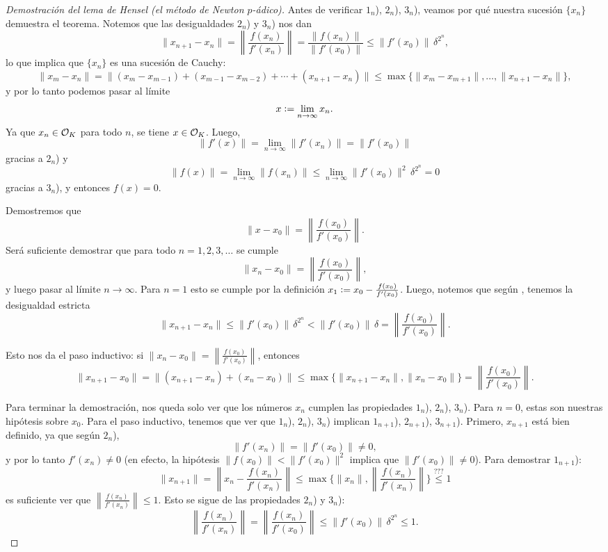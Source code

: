 \documentclass{article}
\numberwithin{equation}{section}
\theoremstyle{definition}
\begin{document}
\begin{proof}[Demostración del lema de Hensel (el método de Newton $p$-ádico)]
  Antes de verificar $1_n$), $2_n$), $3_n$), veamos por qué nuestra sucesión
  $\{ x_n \}$ demuestra el teorema. Notemos que las desigualdades $2_n$) y
  $3_n$) nos dan
  \begin{equation}
    \label{eqn:Hensel-proof-Cauchy-bound}
     \|x_{n+1} - x_n\| =
     \left\|\frac{f (x_n)}{f' (x_n)}\right\| =
     \frac{\|f (x_n)\|}{\|f' (x_0)\|} \le \|f' (x_0)\| \, \delta^{2^n},
  \end{equation}
  lo que implica que $\{ x_n \}$ es una sucesión de Cauchy:
  \[ \|x_m - x_n\| =
     \|(x_m - x_{m-1}) + (x_{m-1} - x_{m-2}) + \cdots + (x_{n+1} - x_n) \| \le
     \max \{ \|x_m - x_{m+1}\|, \ldots, \|x_{n+1} - x_n\| \}, \]
  y por lo tanto podemos pasar al límite
  $$x \mathrel{\mathop:}= \lim_{n\to \infty} x_n.$$
  Ya que $x_n \in \mathcal{O}_K$ para todo $n$, se tiene $x \in \mathcal{O}_K$. Luego,
  $$\|f' (x)\| = \lim_{n\to \infty} \|f' (x_n)\| = \|f' (x_0)\|$$
  gracias a $2_n$) y
  \[ \|f (x)\| = \lim_{n\to \infty} \|f (x_n)\| \le
     \lim_{n\to \infty} \|f' (x_0)\|^2\,\delta^{2^n} = 0 \]
  gracias a $3_n$), y entonces $f (x) = 0$.

  \vspace{1em}

  Demostremos que
  $$\|x - x_0\| = \left\|\frac{f (x_0)}{f' (x_0)}\right\|.$$
  Será suficiente demostrar que para todo $n = 1,2,3,\ldots$ se cumple
  $$\|x_n - x_0\| = \left\|\frac{f (x_0)}{f' (x_0)}\right\|,$$
  y luego pasar al límite $n \to \infty$. Para $n = 1$ esto se cumple por
  la definición $x_1 \mathrel{\mathop:}= x_0 - \frac{f (x_0)}{f' (x_0)}$. Luego, notemos que
  según , tenemos la desigualdad estricta
  \[ \|x_{n+1} - x_n\| \le \|f' (x_0)\| \, \delta^{2^n} <
     \|f' (x_0)\| \, \delta =
     \left\|\frac{f (x_0)}{f' (x_0)}\right\|. \]

  Esto nos da el paso inductivo: si
  $\|x_n - x_0\| = \left\|\frac{f (x_0)}{f' (x_0)}\right\|$, entonces
  \[ \|x_{n+1} - x_0\| =
     \|(x_{n+1} - x_n) + (x_n - x_0)\| \le
     \max \{ \|x_{n+1} - x_n\|, \|x_n - x_0\| \} =
     \left\|\frac{f (x_0)}{f' (x_0)}\right\|. \]

  \vspace{1em}

  Para terminar la demostración, nos queda solo ver que los números $x_n$
  cumplen las propiedades $1_n$), $2_n$), $3_n$). Para $n = 0$, estas son
  nuestras hipótesis sobre $x_0$. Para el paso inductivo, tenemos que ver que
  $1_n$), $2_n$), $3_n$) implican $1_{n+1}$), $2_{n+1}$), $3_{n+1}$). Primero,
  $x_{n+1}$ está bien definido, ya que según $2_n$),
  $$\|f' (x_n)\| = \|f' (x_0)\| \ne 0,$$
  y por lo tanto $f' (x_n) \ne 0$ (en efecto, la hipótesis
  $\|f (x_0)\| < \|f' (x_0)\|^2$ implica que $\|f' (x_0)\| \ne 0$). Para
  demostrar $1_{n+1}$):
  \[ \|x_{n+1}\| = \left\|x_n - \frac{f (x_n)}{f' (x_n)}\right\| \le
     \max \{\|x_n\|, \left\|\frac{f (x_n)}{f' (x_n)}\right\| \} \stackrel{???}{\le} 1 \]
  es suficiente ver que $\left\|\frac{f (x_n)}{f' (x_n)}\right\| \le 1$. Esto
  se sigue de las propiedades $2_n$) y $3_n$):
  \[ \left\|\frac{f (x_n)}{f' (x_n)}\right\| =
     \left\|\frac{f (x_n)}{f' (x_0)}\right\| \le
     \|f' (x_0)\|\,\delta^{2^n} \le 1. \]


\end{proof}
\end{document}
